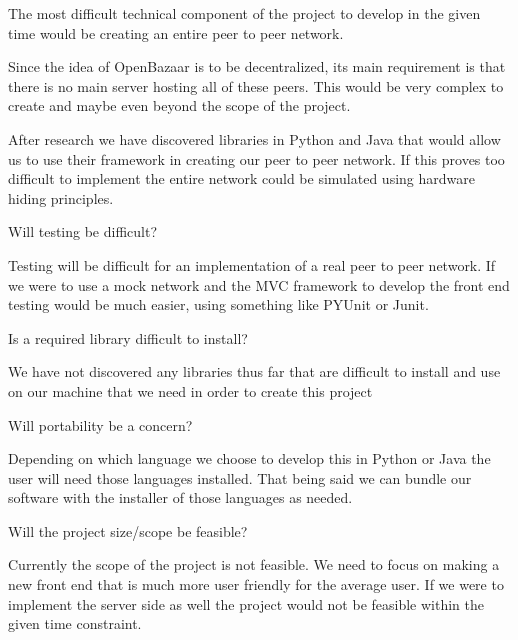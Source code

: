 \documentclass{article}
\begin{document}
The most difficult technical component of the project to develop in the given time would be creating an entire peer to peer network.

Since the idea of OpenBazaar is to be decentralized, its main requirement is that there is no main server hosting all of these peers. This would be very complex to create and maybe even beyond the scope of the project.

After research we have discovered libraries in Python and Java that would allow us to use their framework in creating our peer to peer network. If this proves too difficult to implement the entire network could be simulated using hardware hiding principles.

Will testing be difficult?

Testing will be difficult for an implementation of a real peer to peer network. If we were to use a mock network and the MVC framework to develop the front end testing would be much easier, using something like PYUnit or Junit.

Is a required library difficult to install?

We have not discovered any libraries thus far that are difficult to install and use on our machine that we need in order to create this project

Will portability be a concern?

Depending on which language we choose to develop this in Python or Java the user will need those languages installed. That being said we can bundle our software with the installer of those languages as needed.

Will the project size/scope be feasible?

Currently the scope of the project is not feasible. We need to focus on making a new front end that is much more user friendly for the average user. If we were to implement the server side as well the project would not be feasible within the given time constraint.
\end{document}
